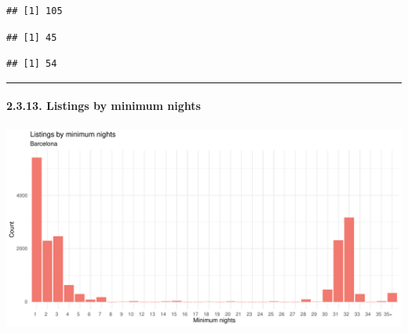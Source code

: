 \documentclass[
]{article}
\newenvironment{Shaded}{\begin{snugshade}}{\end{snugshade}}
\newcommand{\AttributeTok}[1]{\textcolor[rgb]{0.13,0.29,0.53}{#1}}
\newcommand{\ConstantTok}[1]{\textcolor[rgb]{0.56,0.35,0.01}{#1}}
\newcommand{\FunctionTok}[1]{\textcolor[rgb]{0.13,0.29,0.53}{\textbf{#1}}}
\newcommand{\NormalTok}[1]{#1}
\newcommand{\SpecialCharTok}[1]{\textcolor[rgb]{0.81,0.36,0.00}{\textbf{#1}}}
\newcommand{\StringTok}[1]{\textcolor[rgb]{0.31,0.60,0.02}{#1}}
\begin{document}
\begin{verbatim}
## [1] 105
\end{verbatim}

\begin{Shaded}
\end{Shaded}

\begin{verbatim}
## [1] 45
\end{verbatim}

\begin{Shaded}
\end{Shaded}

\begin{verbatim}
## [1] 54
\end{verbatim}

\begin{center}\rule{0.5\linewidth}{0.5pt}\end{center}

\hypertarget{listings-by-minimum-nights}{%
\paragraph{2.3.13. Listings by minimum
nights}\label{listings-by-minimum-nights}}

\begin{center}\includegraphics{Barcelona-AirBnB-Insights_files/figure-latex/plot13-1} \end{center}
\end{document}
